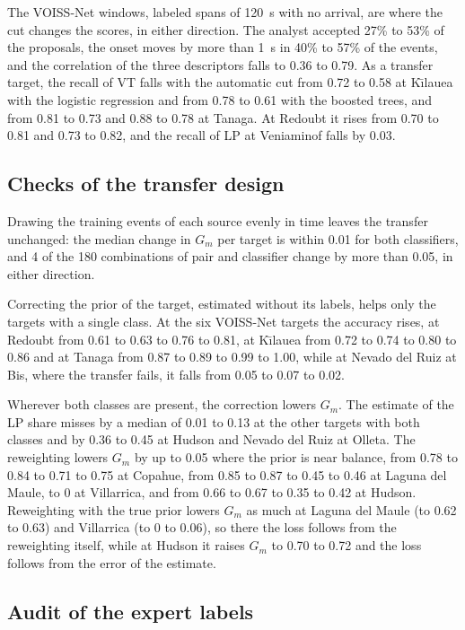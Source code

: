 \documentclass[pdflatex,sn-mathphys-num]{sn-jnl}
\begin{document}
The VOISS-Net windows, labeled spans of 120~s with no arrival, are where the
cut changes the scores, in either direction. The analyst accepted 27\% to 53\% of the proposals, the onset moves by
more than 1~s in 40\% to 57\% of the events, and the correlation of the
three descriptors falls to 0.36 to 0.79. As a transfer target, the recall of
VT falls with the automatic cut from 0.72 to 0.58 at K\={\i}lauea with the
logistic regression and from 0.78 to 0.61 with the boosted trees, and from
0.81 to 0.73 and 0.88 to 0.78 at Tanaga. At Redoubt it rises from 0.70 to
0.81 and 0.73 to 0.82, and the recall of LP at Veniaminof falls by 0.03.

\subsection{Checks of the transfer design}\label{subsec:res_checks}

Drawing the training events of each source evenly in time leaves the transfer
unchanged: the median change in $G_m$ per target is within 0.01 for both
classifiers, and 4 of the 180 combinations of pair and classifier change by
more than 0.05, in either direction.

Correcting the prior of the target, estimated without its labels, helps
only the targets with a single class. At the six VOISS-Net targets the
accuracy rises, at Redoubt from 0.61 to 0.63 to 0.76 to 0.81, at
K\={\i}lauea from 0.72 to 0.74 to 0.80 to 0.86 and at Tanaga from 0.87 to
0.89 to 0.99 to 1.00, while at Nevado del Ruiz at Bis, where the transfer
fails, it falls from 0.05 to 0.07 to 0.02.

Wherever both classes are present, the correction lowers $G_m$. The estimate of the LP share misses by a median of 0.01 to 0.13 at the
other targets with both classes and by 0.36 to 0.45 at Hudson and Nevado
del Ruiz at Olleta. The reweighting lowers $G_m$ by up to 0.05 where the
prior is near balance, from 0.78 to 0.84 to 0.71 to 0.75 at Copahue, from
0.85 to 0.87 to 0.45 to 0.46 at Laguna del Maule, to 0 at Villarrica, and
from 0.66 to 0.67 to 0.35 to 0.42 at Hudson.
Reweighting with the true prior lowers $G_m$ as much at Laguna del Maule (to
0.62 to 0.63) and Villarrica (to 0 to 0.06), so there the loss follows from
the reweighting itself, while at Hudson it raises $G_m$ to 0.70 to 0.72 and
the loss follows from the error of the estimate.

\subsection{Audit of the expert labels}\label{subsec:res_audit}
\end{document}
